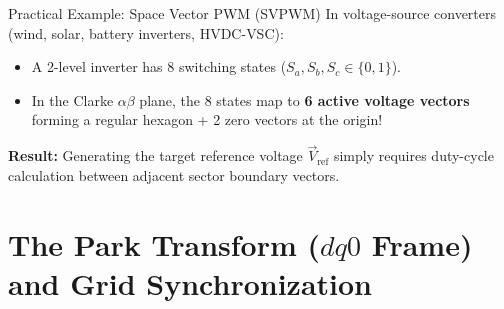 \begin{frame}[allowframebreaks]{Practical Example: Space Vector PWM (SVPWM)}
    In voltage-source converters (wind, solar, battery inverters, HVDC-VSC):
    \begin{itemize}
        \item A 2-level inverter has 8 switching states ($S_a, S_b, S_c \in \{0, 1\}$).
        \item In the Clarke $\alpha\beta$ plane, the 8 states map to \textbf{6 active voltage vectors} forming a regular hexagon + 2 zero vectors at the origin!
    \end{itemize}

    \begin{center}
    \end{center}
    \textbf{Result:} Generating the target reference voltage $\vec{V}_{\text{ref}}$ simply requires duty-cycle calculation between adjacent sector boundary vectors.
\end{frame}


\section{\texorpdfstring{The Park Transform ($dq0$ Frame) and Grid Synchronization}{The Park Transform (dq0 Frame) and Grid Synchronization}}

